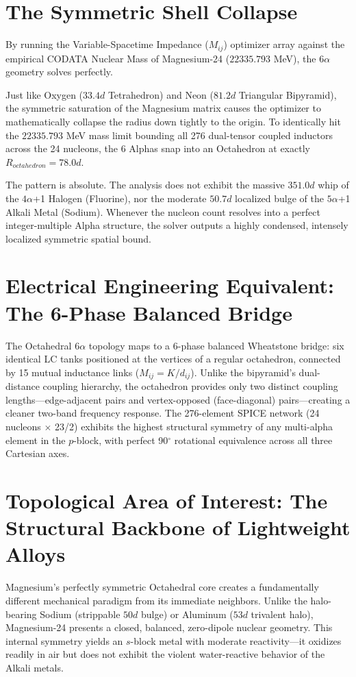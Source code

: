 \section{The Symmetric Shell Collapse}
By running the Variable-Spacetime Impedance ($M_{ij}$) optimizer array against the empirical CODATA Nuclear Mass of Magnesium-24 ($22335.793$ MeV), the $6\alpha$ geometry solves perfectly. 

Just like Oxygen ($33.4d$ Tetrahedron) and Neon ($81.2d$ Triangular Bipyramid), the symmetric saturation of the Magnesium matrix causes the optimizer to mathematically collapse the radius down tightly to the origin. To identically hit the $22335.793$ MeV mass limit bounding all 276 dual-tensor coupled inductors across the 24 nucleons, the 6 Alphas snap into an Octahedron at exactly $R_{octahedron} = 78.0d$.

The pattern is absolute. The analysis does not exhibit the massive $351.0d$ whip of the $4\alpha$+1 Halogen (Fluorine), nor the moderate $50.7d$ localized bulge of the $5\alpha$+1 Alkali Metal (Sodium). Whenever the nucleon count resolves into a perfect integer-multiple Alpha structure, the solver outputs a highly condensed, intensely localized symmetric spatial bound.

\section{Electrical Engineering Equivalent: The 6-Phase Balanced Bridge}
The Octahedral $6\alpha$ topology maps to a 6-phase balanced Wheatstone bridge: six identical LC tanks positioned at the vertices of a regular octahedron, connected by 15 mutual inductance links ($M_{ij} = K/d_{ij}$). Unlike the bipyramid's dual-distance coupling hierarchy, the octahedron provides only two distinct coupling lengths---edge-adjacent pairs and vertex-opposed (face-diagonal) pairs---creating a cleaner two-band frequency response. The 276-element SPICE network (24 nucleons $\times$ 23/2) exhibits the highest structural symmetry of any multi-alpha element in the $p$-block, with perfect 90$^\circ$ rotational equivalence across all three Cartesian axes.

\section{Topological Area of Interest: The Structural Backbone of Lightweight Alloys}
Magnesium's perfectly symmetric Octahedral core creates a fundamentally different mechanical paradigm from its immediate neighbors. Unlike the halo-bearing Sodium (strippable $50d$ bulge) or Aluminum ($53d$ trivalent halo), Magnesium-24 presents a closed, balanced, zero-dipole nuclear geometry. This internal symmetry yields an $s$-block metal with moderate reactivity---it oxidizes readily in air but does not exhibit the violent water-reactive behavior of the Alkali metals.

